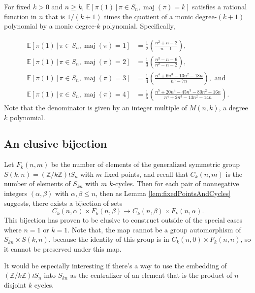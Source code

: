 \begin{conjecture}
  For fixed $k > 0$ and $n \geq k$,
  $\mathbb{E}[\pi(1)\, |\, \pi \in S_n, \operatorname{maj}(\pi) = k]$
  satisfies a rational function in $n$ that is $1/(k+1)$ times the quotient of a monic
  degree-$(k+1)$ polynomial by a monic degree-$k$ polynomial. Specifically,

  \begin{align}
    \mathbb{E}[\pi(1)\, |\, \pi \in S_n, \operatorname{maj}(\pi) = 1] &= \frac{1}{2}\left(\frac{n^2 + n - 2}{n-1}\right),
    \\[2mm]
    \mathbb{E}[\pi(1)\, |\, \pi \in S_n, \operatorname{maj}(\pi) = 2] &= \frac{1}{3}\left(\frac{n^3 - n - 6}{n^2 - n - 2}\right),
    \\[2mm]
    \mathbb{E}[\pi(1)\, |\, \pi \in S_n, \operatorname{maj}(\pi) = 3] &= \frac{1}{4}\left(\frac{n^4 + 6 n^3 - 13 n^2 - 18 n}{n^3 - 7n}\right),
    \text{ and}
    \\[2mm]
    \mathbb{E}[\pi(1)\, |\, \pi \in S_n, \operatorname{maj}(\pi) = 4] &= \frac{1}{5}\left(\frac{n^5 + 20 n^4 - 45 n^3 - 80 n^2 - 16 n}{n^4 + 2 n^3 - 13 n^2 - 14 n}\right).
  \end{align}
  Note that the denominator is given by an integer multiple of $M(n,k)$,
  a degree $k$ polynomial.
\end{conjecture}

\subsection{An elusive bijection}

  Let $F_k(n, m)$ be the number of elements of the generalized symmetric group
  $S(k,n) = (\mathbb{Z}/k\mathbb{Z}) \wr S_n$ with $m$ fixed points,
  and recall that $C_k(n,m)$ is the number of elements of $S_{kn}$ with $m$ $k$-cycles.
  Then for each pair of nonnegative integers $(\alpha, \beta)$
  with $\alpha, \beta \leq n$, then as Lemma \ref{lem:fixedPointsAndCycles} suggests,
  there exists a bijection of sets \begin{equation}
    C_k(n, \alpha) \times F_k(n, \beta) \rightarrow C_k(n, \beta) \times F_k(n, \alpha).
  \end{equation}
  This bijection has proven to be elusive to construct outside of the special
  cases where $n=1$ or $k=1$.
  Note that, the map cannot be a group automorphism of $S_{kn} \times S(k,n)$,
  because the identity of this group is in $C_k(n,0) \times F_k(n,n)$, so it
  cannot be preserved under this map.

  It would be especially interesting if there's a way to use the embedding of
  $(\mathbb{Z}/k\mathbb{Z}) \wr S_n$ into $S_{kn}$ as the centralizer of an
  element that is the product of $n$ disjoint $k$ cycles.
